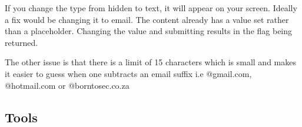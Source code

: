 If you change the type from hidden to text, it will appear on your screen. Ideally a fix would be changing it to email. The content already has a value set rather than a placeholder. Changing the value and submitting results in the flag being returned.

The other issue is that there is a limit of 15 characters which is small and makes it easier to guess when one subtracts an email suffix i.e @gmail.com, @hotmail.com or @borntosec.co.za

\subsection{Tools}

\begin{figure}[!htb]
    \centering
     \quad
     \\
     \quad
     \\
     \quad

\end{figure}
